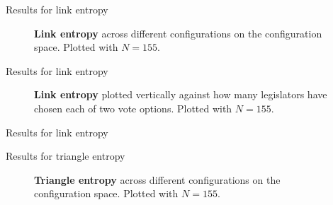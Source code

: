 \begin{frame}{Results for link entropy}
\setlength\fboxsep{0pt}
\setlength\fboxrule{0pt}
\vspace{-2mm}
\begin{figure}[h]
 \centering
 \caption{\textbf{Link entropy} across different configurations on the configuration space. Plotted with $N=155$.}
 \label{fig:ps_sL}
\end{figure}
\end{frame}

\setlength\fboxsep{0pt}
\setlength\fboxrule{0pt}
\begin{frame}{Results for link entropy}
\vspace{-2mm}
\begin{figure}[h]
    \centering
    \caption{\textbf{Link entropy} plotted vertically against how many legislators have chosen each of two vote options. Plotted with $N=155.$}
    \label{fig:SL}
\end{figure}
\end{frame}

\begin{frame}{Results for link entropy}
\end{frame}

\begin{frame}{Results for triangle entropy}
\setlength\fboxsep{0pt}
\setlength\fboxrule{0pt}
\vspace{-2mm}
\begin{figure}[h]
 \centering
 \caption{\textbf{Triangle entropy} across different configurations on the configuration space. Plotted with $N=155.$}
 \label{fig:ps_sT}
\end{figure}
\end{frame}




